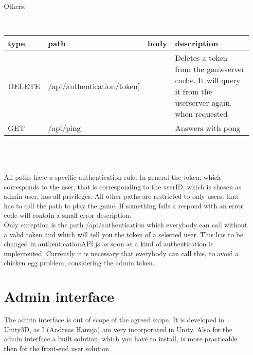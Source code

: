 \noindent Others:
\begin{small}
\\ \hspace*{-1cm} \begin{tabular}{|p{1.5cm}| p{4.5cm} | p{2.5cm} | p{6cm} |}
    \hline
    type & path & body & description \\ \hline
    DELETE & /api/authentication/token] & & Deletes a token from the gameserver cache. It will query it from the userserver again, when requested  \\ \hline
    GET & /api/ping & & Answers with pong \\ \hline


       \end{tabular}
\end{small}\\\\\\
All paths have a specific authentication rule. In general the token, which corresponds to the user, that is corresponding to the userID, which is chosen as admin user, has all privileges. All other paths are restricted to only users, that has to call the path to play the game. If something fails a respond with an error code will contain a small error description.\\
Only exception is the path /api/authentication which everybody can call without a valid token and which will tell you the token of a selected user. This has to be changed in authenticationAPI.js as soon as a kind of authentication is implemented. Currently it is necessary that everybody can call this, to avoid a chicken egg problem, considering the admin token.



\section {Admin interface}
The admin interface is out of scope of the agreed scope. It is developed in Unity3D, as I (Andreas Hanuja) am very incorporated in Unity. Also for the admin interface a built solution, which you have to install, is more practicable then for the front-end user solution.\\

